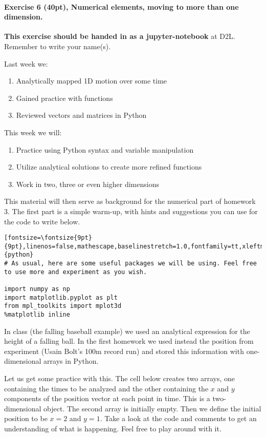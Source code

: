 \documentclass[%
oneside,                 %
final,                   %
10pt]{article}
\begin{document}
\paragraph{Exercise 6 (40pt), Numerical elements, moving to more than one dimension.}
\textbf{This exercise should be handed in as a jupyter-notebook} at D2L. Remember to write your name(s). 

Last week we:
\begin{enumerate}
\item Analytically mapped 1D motion over some time

\item Gained practice with functions

\item Reviewed vectors and matrices in Python
\end{enumerate}

\noindent
This week we will:
\begin{enumerate}
\item Practice using Python syntax and variable manipulation

\item Utilize analytical solutions to create more refined functions

\item Work in two, three or even higher dimensions
\end{enumerate}

\noindent
This material will then serve as background for the numerical part of homework 3. The first part is a simple warm-up, with hints and suggestions you can use for the code to write below. 

\begin{verbatim}[fontsize=\fontsize{9pt}{9pt},linenos=false,mathescape,baselinestretch=1.0,fontfamily=tt,xleftmargin=7mm]{python}
# As usual, here are some useful packages we will be using. Feel free to use more and experiment as you wish.

import numpy as np
import matplotlib.pyplot as plt
from mpl_toolkits import mplot3d
%matplotlib inline
\end{verbatim}

In class (the falling baseball example) we used an  analytical expression for the height of a falling ball.
In the first homework we used instead the position from experiment (Usain Bolt's 100m record run) and stored this
information with one-dimensional arrays in Python.

Let us get some practice with this. The cell below creates two arrays,
one containing the times to be analyzed and the other containing the $x$
and $y$ components of the position vector at each point in time.  This is a two-dimensional object. The
second array is initially empty. Then we define  the initial
position to be $x=2$ and $y=1$. Take a look at the code and comments
to get an understanding of what is happening. Feel free to play around with it.
\end{document}
